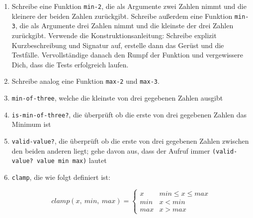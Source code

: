 \begin{aufgabe}

  \begin{enumerate}

  \item Schreibe eine Funktion \lstinline{min-2}, die als Argumente zwei
    Zahlen nimmt und die kleinere der beiden Zahlen zurückgibt.  Schreibe
    außerdem eine Funktion \lstinline{min-3}, die als Argumente drei
    Zahlen nimmt und die kleinste der drei Zahlen zurückgibt.  Verwende
    die Konstruktionsanleitung: Schreibe
    explizit Kurzbeschreibung und Signatur auf, erstelle dann das
    Gerüst und die Testfälle.  Vervollständige danach den Rumpf der
    Funktion und vergewissere Dich, dass die Tests erfolgreich laufen.
    
  \item Schreibe analog eine Funktion \lstinline{max-2} und \lstinline{max-3}.
    
  \item \lstinline{min-of-three}, welche die kleinste von drei
    gegebenen Zahlen ausgibt
  \item \lstinline{is-min-of-three?}, die überprüft ob die erste
    von drei gegebenen Zahlen das Minimum ist
  \item \lstinline{valid-value?}, die überprüft ob die erste von
    drei gegebenen Zahlen zwischen den beiden anderen liegt; gehe
    davon aus, dass der Aufruf immer \lstinline{(valid-value? value min max)}
    lautet 
  \item \lstinline{clamp}, die wie folgt definiert ist:
    
    \[\mathit{clamp}(x,\ \mathit{min},\ \mathit{max})=
    \begin{cases} 
      x & \mathit{min} \leq x \leq \mathit{max}\\ 
      \mathit{min} & x < \mathit{min} \\ 
      \mathit{max} & x > \mathit{max}
    \end{cases}
    \]
    
  \end{enumerate}
\end{aufgabe}

